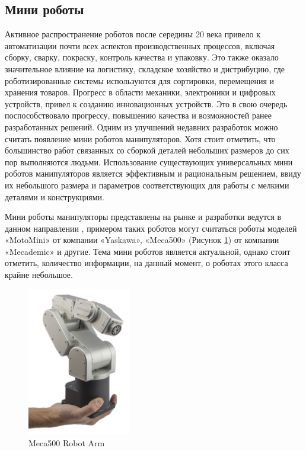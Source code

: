 \subsection{Мини роботы}

Активное распространение роботов после середины 20 века привело к автоматизации почти всех аспектов производственных процессов, включая сборку, сварку, покраску, контроль качества и упаковку. Это также оказало значительное влияние на логистику, складское хозяйство и дистрибуцию, где роботизированные системы используются для сортировки, перемещения и хранения товаров. Прогресс в области механики, электроники и цифровых устройств, привел к созданию инновационных устройств. Это в свою очередь поспособствовало прогрессу, повышению качества и возможностей ранее разработанных решений. Одним из улучшений недавних разработок можно считать появление мини роботов манипуляторов.
Хотя стоит отметить, что большинство работ связанных со сборкой деталей небольших размеров до сих пор выполняются людьми. Использование существующих универсальных мини роботов манипуляторов является эффективным и рациональным решением, ввиду их небольшого размера и параметров соответствующих для работы с мелкими деталями и конструкциями.

Мини роботы манипуляторы представлены на рынке и разработки ведутся в данном направлении \citep{Li2022}, примером таких роботов могут считаться роботы моделей «MotoMini» от компании «Yaskawa», «Meca500» (Рисунок \ref{meca}) от компании «Mecademic»  и другие. Тема мини роботов является актуальной, однако стоит отметить, количество информации, на данный момент, о роботах этого класса крайне небольшое.

\begin{figure}[H]
	\centering
	\includegraphics[width=0.4\textwidth]{Src/images/Meca500.jpg}
	\caption{Meca500 Robot Arm}
	\label{meca}
\end{figure}

